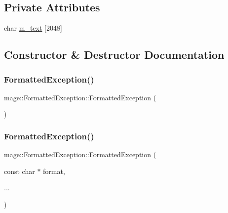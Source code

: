 \subsection*{Private Attributes}
\begin{DoxyCompactItemize}
\item 
char \hyperlink{structmage_1_1_formatted_exception_aadccdcc1db09285dadc6b5a30681e05b}{m\+\_\+text} \mbox{[}2048\mbox{]}
\end{DoxyCompactItemize}


\subsection{Constructor \& Destructor Documentation}
\hypertarget{structmage_1_1_formatted_exception_a77b82a969ec33a3aacec74a5adc4ab8b}{}\label{structmage_1_1_formatted_exception_a77b82a969ec33a3aacec74a5adc4ab8b} 
\subsubsection{\texorpdfstring{Formatted\+Exception()}{FormattedException()}\hspace{0.1cm}{\footnotesize\ttfamily [1/4]}}
{\footnotesize\ttfamily mage\+::\+Formatted\+Exception\+::\+Formatted\+Exception (\begin{DoxyParamCaption}{ }\end{DoxyParamCaption})}

\hypertarget{structmage_1_1_formatted_exception_a3fe833a49052a2db99c023b1b1d43621}{}\label{structmage_1_1_formatted_exception_a3fe833a49052a2db99c023b1b1d43621} 
\subsubsection{\texorpdfstring{Formatted\+Exception()}{FormattedException()}\hspace{0.1cm}{\footnotesize\ttfamily [2/4]}}
{\footnotesize\ttfamily mage\+::\+Formatted\+Exception\+::\+Formatted\+Exception (\begin{DoxyParamCaption}\item[{const char $\ast$}]{format,  }\item[{}]{... }\end{DoxyParamCaption})\hspace{0.3cm}{\ttfamily [explicit]}}

